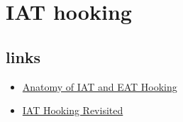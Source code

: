 \section{IAT hooking}

\subsection{links}
\begin{itemize}
    \item \href{https://securitymaven.medium.com/anatomy-of-iat-and-eat-hooking-9612eb15baf1}{Anatomy of IAT and EAT Hooking}
    \item \href{https://github.com/m0n0ph1/IAT-Hooking-Revisited}{IAT Hooking Revisited}
\end{itemize}